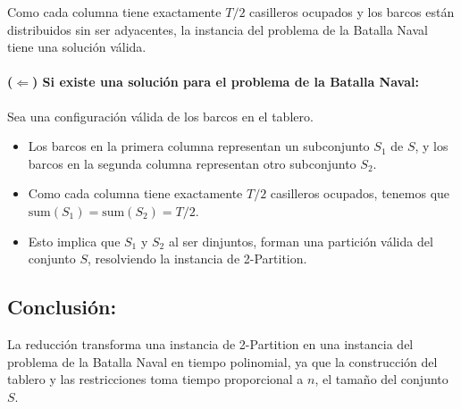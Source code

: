 Como cada columna tiene exactamente $T / 2$ casilleros ocupados y los barcos están distribuidos sin ser adyacentes, la instancia del problema de la Batalla Naval tiene una solución válida.

\paragraph{($\Leftarrow$) Si existe una solución para el problema de la Batalla Naval:}

Sea una configuración válida de los barcos en el tablero.  
\begin{itemize}
    \item Los barcos en la primera columna representan un subconjunto $S_1$ de $S$, y los barcos en la segunda columna representan otro subconjunto $S_2$.
    \item Como cada columna tiene exactamente $T / 2$ casilleros ocupados, tenemos que $\text{sum}(S_1) = \text{sum}(S_2) = T / 2$.
    \item Esto implica que $S_1$ y $S_2$ al ser dinjuntos, forman una partición válida del conjunto $S$, resolviendo la instancia de 2-Partition.
\end{itemize}

\subsection*{Conclusión:}

La reducción transforma una instancia de 2-Partition en una instancia del problema de la Batalla Naval en tiempo polinomial, ya que la construcción del tablero y las restricciones toma tiempo proporcional a $n$, el tamaño del conjunto $S$.
